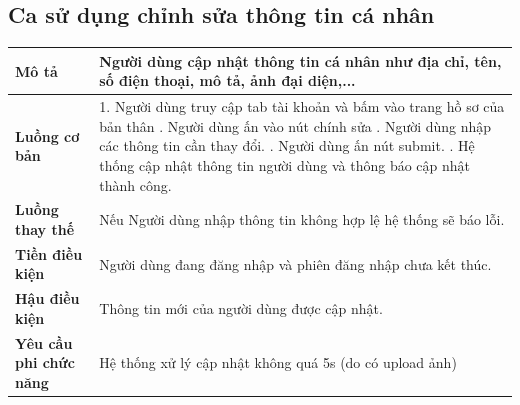 \subsection{Ca sử dụng chỉnh sửa thông tin cá nhân}
\vspace{0.5cm}


\noindent 
\begin{tabularx}{\linewidth}{| l | X |} 
\hline 
\textbf{Mô tả} & Người dùng cập nhật thông tin cá nhân như
địa chỉ, tên, số điện thoại, mô tả, ảnh đại diện,... \\ 
\hline 
\textbf{Luồng cơ bản} & 1. Người dùng truy cập tab tài khoản và bấm vào trang hồ sơ của bản thân \newline
                       2. Người dùng ấn vào nút chính sửa \newline
                       3. Người dùng nhập các thông tin cần thay đổi. \newline
                       5. Người dùng ấn nút submit. \newline
                       6. Hệ thống cập nhật thông tin người dùng và thông báo cập nhật thành công. \\
\hline 
\textbf{Luồng thay thế} & Nếu Người dùng nhập thông tin không hợp lệ hệ thống sẽ báo lỗi. \\
\hline 
\textbf{Tiền điều kiện} & Người dùng đang đăng nhập và phiên đăng nhập chưa kết thúc. \\
\hline 
\textbf{Hậu điều kiện} & Thông tin mới của người dùng được cập nhật. \\

\hline 
\textbf{Yêu cầu phi chức năng} & Hệ thống xử lý cập nhật không quá 5s (do có upload ảnh) \\ 
\hline 
\end{tabularx}

\vspace{0.8cm}

